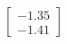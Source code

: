 \documentclass[preview]{standalone}
\begin{document}
\begin{align*}
\begin{bmatrix} -1.35 \\ -1.41 \end{bmatrix}
\end{align*}
\end{document}
